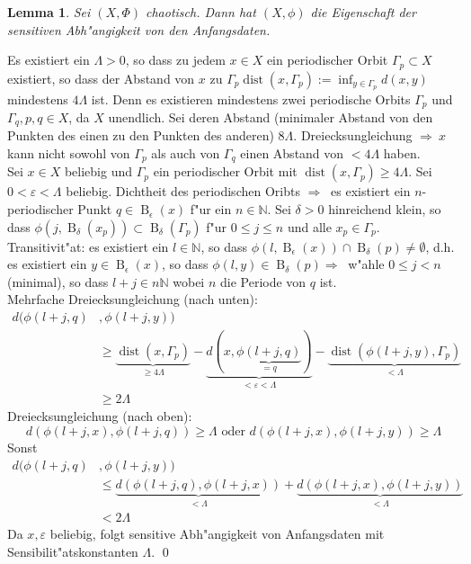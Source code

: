 \documentclass[a4paper, 13pt]{scrreprt}
\newtheorem{lemma}[theorem]{Lemma}
\theoremstyle{definition} \newtheorem{definition}{Definition}[section]
\newenvironment{beweis}[1][Beweis]{\begin{trivlist}
\item[\hskip \labelsep {\bfseries #1}]}{\end{trivlist}}
\begin{document}
\begin{lemma}
Sei $(X,\Phi)$ chaotisch. Dann hat $(X,\phi)$ die Eigenschaft der sensitiven Abh"angigkeit von den Anfangsdaten.
\end{lemma}
\begin{beweis}
Es existiert ein $\Lambda>0$, so dass zu jedem $x\in X$ ein periodischer Orbit $\Gamma_p\subset X$ existiert, so dass der Abstand von $x$ zu $\Gamma_p \operatorname{dist}(x,\Gamma_p):=\inf_{y\in\Gamma_p} d(x,y)$ mindestens $4\Lambda$ ist. Denn es existieren mindestens zwei periodische Orbits $\Gamma_p$ und $\Gamma_q, p,q\in X$, da $X$ unendlich. Sei deren Abstand (minimaler Abstand von den Punkten des einen zu den Punkten des anderen) $8\Lambda$. Dreiecksungleichung $\Rightarrow\ x$ kann nicht sowohl von $\Gamma_p$ als auch von $\Gamma_q$ einen Abstand von $<4\Lambda$ haben.\\
Sei $x\in X$ beliebig und $\Gamma_p$ ein periodischer Orbit mit $\operatorname{dist}(x,\Gamma_p)\geq 4\Lambda$. Sei $0<\varepsilon <\Lambda$ beliebig. Dichtheit des periodischen Oribts $\Rightarrow\ $ es existiert ein $n$-periodischer Punkt $q\in\operatorname{B}_{\epsilon}(x)$ f"ur ein $n\in\mathbb{N}$. Sei $\delta >0$ hinreichend klein, so dass $\phi(j, \operatorname{B}_{\delta}(x_p))\subset\operatorname{B}_{\delta}(\Gamma_p)$ f"ur $0\leq j\leq n$ und alle $x_p\in\Gamma_p$.
Transitivit"at: es existiert ein $l\in\mathbb{N}$, so dass $\phi(l, \operatorname{B}_{\epsilon}(x))\cap\operatorname{B}_{\delta}(p)\neq\emptyset$, d.h. es existiert ein $y\in\operatorname{B}_{\epsilon}(x)$, so dass $\phi(l, y)\in\operatorname{B}_{\delta}(p)\Rightarrow\ $ w"ahle $0\leq j<n$ (minimal), so dass $l+j\in n\mathbb{N}$ wobei $n$ die Periode von $q$ ist.\\
Mehrfache Dreiecksungleichung (nach unten):
\begin{align*}
d(\phi(l+j, q)&,\phi(l+j, y))\\
&\geq\underbrace{\operatorname{dist}(x,\Gamma_p)}_{\geq 4\Lambda}-\underbrace{d(x,\underbrace{\phi(l+j, q)}_{=q})}_{<\varepsilon<\Lambda}-\underbrace{\operatorname{dist}(\phi(l+j, y),\Gamma_p)}_{<\Lambda}\\
&\geq 2\Lambda
\end{align*}
Dreiecksungleichung (nach oben):
\[d(\phi({l+j}, x),\phi({l+j},q))\geq\Lambda\text{ oder } d(\phi({l+j}, x),\phi({l+j},y))\geq\Lambda\]
Sonst
\begin{align*}
d(\phi(l+j, q)&,\phi(l+j, y))\\
&\leq\underbrace{d(\phi(l+j, q),\phi(l+j,x))}_{<\Lambda}+\underbrace{d(\phi(l+j, x),\phi(l+j,y))}_{<\Lambda}\\
&<2\Lambda
\end{align*}
Da $x,\varepsilon$ beliebig, folgt sensitive Abh"angigkeit von Anfangsdaten mit Sensibilit"atskonstanten $\Lambda$. \qed
\end{beweis}
\end{document}
